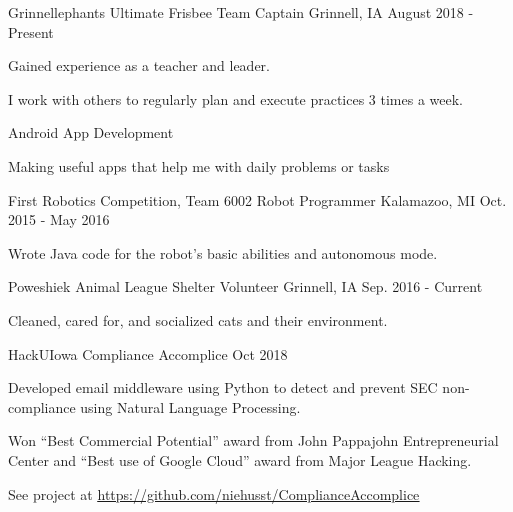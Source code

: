 \documentclass[12pt, a4paper]{awesome-cv}
\begin{document}
\begin{cventries}
  \cventry
    {Grinnellephants Ultimate Frisbee}
    {Team Captain}
    {Grinnell, IA}
    {August 2018 - Present}
    {
      \begin{cvitems}
        \item {Gained experience as a teacher and leader.}
        \item {I work with others to regularly plan and execute practices 3 times a week.}
      \end{cvitems}
    }

    \cventry
      {}
      {Android App Development}
      {}
      {}
      {
        \begin{cvitems}
          \item {Making useful apps that help me with daily problems or tasks}
        \end{cvitems}
      }

  \cventry
    {First Robotics Competition, Team 6002}
    {Robot Programmer}
    {Kalamazoo, MI}
    {Oct. 2015 - May 2016}
    {
      \begin{cvitems}
        \item {Wrote Java code for the robot’s basic abilities and autonomous mode.}
      \end{cvitems}
    }

  \cventry
    {Poweshiek Animal League Shelter}
    {Volunteer}
    {Grinnell, IA}
    {Sep. 2016 - Current}
    {
      \begin{cvitems}
        \item {Cleaned, cared for, and socialized cats and their environment.}
      \end{cvitems}
    }

\end{cventries}


\begin{cventries}

    \cventry
	{HackUIowa}
 	{Compliance Accomplice}
	{Oct 2018}
	{}
	{
	  \begin{cvitems}
	     \item{Developed email middleware using Python to detect and prevent SEC non-compliance using Natural Language Processing.}
	     \item{Won “Best Commercial Potential” award from John Pappajohn Entrepreneurial Center and “Best use of Google Cloud” award from Major League Hacking.}
	     \item{See project at \underline{\href{https://github.com/niehusst/ComplianceAccomplice}{https://github.com/niehusst/ComplianceAccomplice}}} 
	  \end{cvitems}
	}
\end{cventries}
\end{document}
